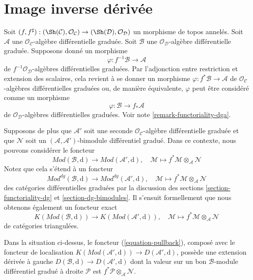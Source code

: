 \section{Image inverse dérivée}
\label{section-derived-pullback}

\noindent
Soit $(f, f^\sharp) : (\Sh(\mathcal{C}), \mathcal{O}_\mathcal{C}) \to (\Sh(\mathcal{D}), \mathcal{O}_\mathcal{D})$ un morphisme de topos annelés.
Soit $\mathcal{A}$ une $\mathcal{O}_\mathcal{C}$-algèbre différentielle graduée.
Soit $\mathcal{B}$ une $\mathcal{O}_\mathcal{D}$-algèbre différentielle graduée.
Supposons donné un morphisme
$$
\varphi : f^{-1}\mathcal{B} \to \mathcal{A}
$$
de $f^{-1}\mathcal{O}_\mathcal{D}$-algèbres différentielles graduées.
Par l'adjonction entre restriction et extension des scalaires, cela revient à se donner un morphisme $\varphi : f^*\mathcal{B} \to \mathcal{A}$ de $\mathcal{O}_\mathcal{C}$-algèbres différentielles graduées ou, de manière équivalente, $\varphi$ peut être considéré comme un morphisme
$$
\varphi : \mathcal{B} \to f_*\mathcal{A}
$$
de $\mathcal{O}_\mathcal{D}$-algèbres différentielles graduées.
Voir note \ref{remark-functoriality-dga}.

\medskip\noindent
Supposons de plus que $\mathcal{A}'$ soit une seconde $\mathcal{O}_\mathcal{C}$-algèbre différentielle graduée et que $\mathcal{N}$ soit un $(\mathcal{A}, \mathcal{A}')$-bimodule différentiel gradué.
Dans ce contexte, nous pouvons considérer le foncteur
$$
\textit{Mod}(\mathcal{B}, \text{d})
\longrightarrow
\textit{Mod}(\mathcal{A}', \text{d}),\quad
\mathcal{M} \longmapsto f^*\mathcal{M} \otimes_{\mathcal{A}} \mathcal{N}
$$
Notez que cela s'étend à un foncteur
$$
\textit{Mod}^{dg}(\mathcal{B}, \text{d})
\longrightarrow
\textit{Mod}^{dg}(\mathcal{A}', \text{d}),\quad
\mathcal{M} \longmapsto f^*\mathcal{M} \otimes_{\mathcal{A}} \mathcal{N}
$$
des catégories différentielles graduées par la discussion des sections \ref{section-functoriality-dg}  et \ref{section-dg-bimodules}.
Il s'ensuit formellement que nous obtenons également un foncteur exact
\begin{equation}
\label{equation-pullback}
K(\textit{Mod}(\mathcal{B}, \text{d}))
\longrightarrow
K(\textit{Mod}(\mathcal{A}', \text{d})),\quad
\mathcal{M} \longmapsto f^*\mathcal{M} \otimes_{\mathcal{A}} \mathcal{N}
\end{equation}
de catégories triangulées.

\begin{lemma}
\label{lemma-derived-tensor-product}
Dans la situation ci-dessus, le foncteur (\ref{equation-pullback}), composé avec le foncteur de localisation $K(\textit{Mod}(\mathcal{A}', \text{d})) \to D(\mathcal{A}', \text{d})$, possède une extension dérivée à gauche $D(\mathcal{B}, \text{d}) \to D(\mathcal{A}', \text{d})$ dont la valeur sur un bon $\mathcal{B}$-module différentiel gradué à droite $\mathcal{P}$ est $f^*\mathcal{P} \otimes_\mathcal{A} \mathcal{N}$.
\end{lemma}

